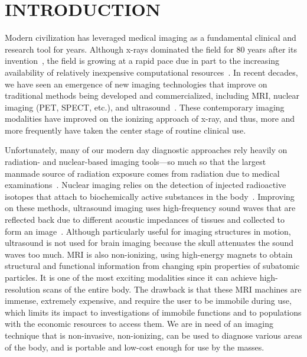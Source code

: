 
\chapter{INTRODUCTION} %
\label{chap:introduction}

Modern civilization has leveraged medical imaging as a fundamental clinical and research tool for years. Although x-rays dominated the field for 80 years after its invention~\cite{Gunderman2012}, the field is growing at a rapid pace due in part to the increasing availability of relatively inexpensive computational resources~\cite{Iglehart2006}. In recent decades, we have seen an emergence of new imaging technologies that improve on traditional methods being developed and commercialized, including MRI, nuclear imaging (PET, SPECT, etc.), and ultrasound~\cite{Suetens2017}. These contemporary imaging modalities have improved on the ionizing approach of x-ray, and thus, more and more frequently have taken the center stage of routine clinical use. 

Unfortunately, many of our modern day diagnostic approaches rely heavily on radiation- and nuclear-based imaging tools---so much so that the largest manmade source of radiation exposure comes from radiation due to medical examinations~\cite{Picano2004}. Nuclear imaging relies on the detection of injected radioactive isotopes that attach to biochemically active substances in the body~\cite{Fahey2002}. Improving on these methods, ultrasound imaging uses high-frequency sound waves that are reflected back due to different acoustic impedances of tissues and collected to form an image~\cite{Chan2011}. Although particularly useful for imaging structures in motion, ultrasound is not used for brain imaging because the skull attenuates the sound waves too much. MRI is also non-ionizing, using high-energy magnets to obtain structural and functional information from changing spin properties of subatomic particles\cite{Plewes2012}. It is one of the most exciting modalities since it can achieve high-resolution scans of the entire body. The drawback is that these MRI machines are immense, extremely expensive, and require the user to be immobile during use, which limits its impact to investigations of immobile functions and to populations with the economic resources to access them. We are in need of an imaging technique that is non-invasive, non-ionizing, can be used to diagnose various areas of the body, and is portable and low-cost enough for use by the masses.

